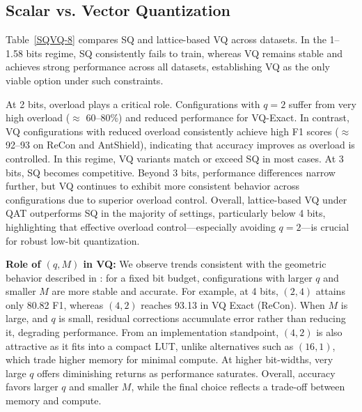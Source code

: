 \documentclass{article}
\theoremstyle{definition}
\theoremstyle{remark}
\begin{document}
\subsection{Scalar vs. Vector Quantization}
Table~\ref{SQVQ-8} compares SQ and lattice-based VQ across datasets. In the 1–1.58 bits regime, SQ consistently fails to train, whereas VQ remains stable and achieves strong performance across all datasets, establishing VQ as the only viable option under such constraints.

At 2 bits, overload plays a critical role. Configurations with $q{=}2$ suffer from very high overload ($\approx$ 60–80\%) and reduced performance for VQ-Exact. In contrast, VQ configurations with reduced overload consistently achieve high F1 scores ($\approx$92–93 on ReCon and AntShield), indicating that accuracy improves as overload is controlled. In this regime, VQ variants match or exceed SQ in most cases.
At 3 bits, SQ becomes competitive. Beyond 3 bits, performance differences narrow further, but VQ continues to exhibit more consistent behavior across configurations due to superior overload control.
Overall, lattice-based VQ under QAT outperforms SQ in the majority of settings, particularly below 4 bits, highlighting that effective overload control—especially avoiding $q{=}2$—is crucial for robust low-bit quantization.

\noindent \textbf{Role of $(q,M)$ in VQ:}
We observe trends consistent with the geometric behavior described in \cite{hnlq}: for a fixed bit budget, configurations with larger $q$ and smaller $M$ are more stable and accurate. For example, at 4 bits, $(2,4)$ attains only 80.82 F1, whereas $(4,2)$ reaches 93.13 in VQ Exact (ReCon). When $M$ is large, and $q$ is small, residual corrections accumulate error rather than reducing it, degrading performance. From an implementation standpoint, $(4,2)$ is also attractive as it fits into a compact LUT, unlike alternatives such as $(16,1)$, which trade higher memory for minimal compute. At higher bit-widths, very large $q$ offers diminishing returns as performance saturates. Overall, accuracy favors larger $q$ and smaller $M$, while the final choice reflects a trade-off between memory and compute.

         
\end{document}
